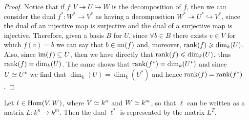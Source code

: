 \begin{proof}
  Notice that if \(f : V \twoheadrightarrow U \hookrightarrow W\) is the
  decomposition of \(f\), then we can consider the dual \(f^\ast: W^\ast \to
  V^\ast\) as having a decomposition \(W^\ast \twoheadrightarrow U^\ast
  \hookrightarrow V^\ast\), since the dual of an injective map is surjective and
  the dual of a surjective map is injective. Therefore, given a basis \(B\) for
  \(U\), since \(\forall b \in B\) there exists \(v \in V\) for which \(f(v) =
  b\) we can say that \(b \in \operatorname{im}(f)\) and, moreover, \(\operatorname{rank}(f) \geqslant
  \dim_k(U)\). Also, since \(\operatorname{im}(f) \subseteq U\), then we have directly that
  \(\operatorname{rank}(f) \leqslant \dim_k(U)\), thus \(\operatorname{rank}(f) = \dim_k(U)\). The same shows
  that \(\operatorname{rank}(f^\ast) = \dim_k(U^\ast)\) and since \(U \simeq U^\ast\) we find
  that \(\dim_k(U) = \dim_k(U^\ast)\) and hence \(\operatorname{rank}(f) = \operatorname{rank}(f^\ast)\).
\end{proof}

\begin{proposition}\label{prop: dual matrix equals transpose}
  Let \(\ell \in \operatorname{Hom}(V, W)\), where \(V \simeq k^n\) and \(W \simeq k^m\), so that
  \(\ell\) can be written as a matrix \(L : k^n \to k^m\). Then the dual
  \(\ell^\ast\) is represented by the matrix \(L^T\).
\end{proposition}

